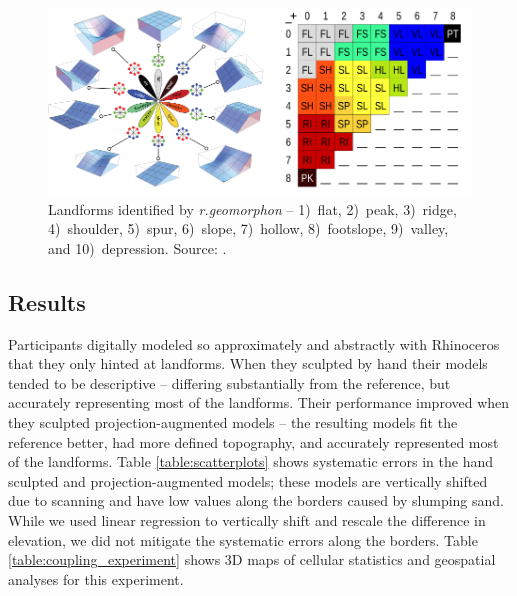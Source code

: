 \documentclass[prodmode,acmtochi]{acmsmall} %
\begin{document}
\begin{figure}
\begin{center}
		\includegraphics[width=\textwidth]{images/geomorphons_legend.png}
	\caption{Landforms identified by \textit{r.geomorphon} --
		1)~flat, 
		2)~peak, 
		3)~ridge, 
		4)~shoulder, 
		5)~spur, 
		6)~slope, 
		7)~hollow, 
		8)~footslope, 
		9)~valley, and
		10)~depression.
		Source: \cite{r.geomorphon}.}
	\label{fig:geomorphons}
\end{center}
\end{figure}

\subsection{Results}
%
Participants digitally modeled so approximately and abstractly 
with Rhinoceros
that they only hinted at landforms. %
%
When they sculpted by hand
their models tended to be descriptive -- 
differing substantially from the reference, but
accurately representing most of the landforms. 
%
Their performance improved 
when they sculpted projection-augmented models --
the resulting models
fit the reference better, 
had more defined topography, 
and accurately represented most of the landforms.
%
Table \ref{table:scatterplots} shows systematic errors
in the hand sculpted and projection-augmented models;
these models are vertically shifted due to scanning
and have low values along the borders
caused by slumping sand. 
While we used linear regression 
to vertically shift and rescale the difference in elevation, 
we did not mitigate the systematic errors
along the borders. 
%
Table \ref{table:coupling_experiment} shows 3D maps of cellular statistics 
and geospatial analyses for this experiment.
\end{document}

